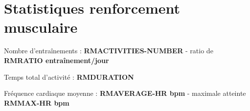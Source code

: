 \documentclass[a4paper,french,11pt]{report}
\begin{document}

\section*{Statistiques renforcement musculaire}
\thispagestyle{empty}

\textbullet Nombre d'entraînements : \textbf{RMACTIVITIES-NUMBER} -
ratio de \textbf{RMRATIO entraînement/jour}

\textbullet Temps total d'activité : \textbf{RMDURATION}

\textbullet Fréquence cardiaque moyenne : \textbf{RMAVERAGE-HR bpm} -
maximale atteinte \textbf{RMMAX-HR bpm}

\end{document}
